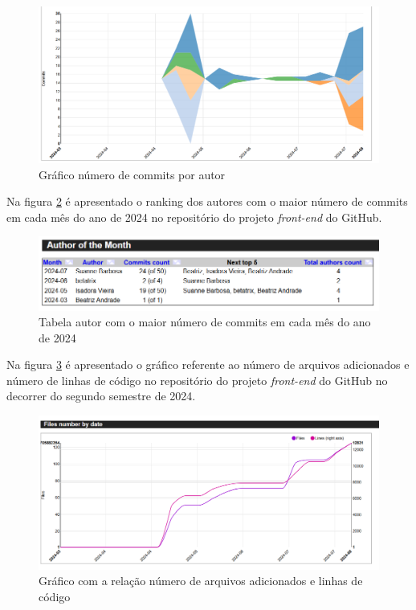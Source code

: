 \begin{figure}[ht]
        \centering
\includegraphics[width=1.0\textwidth]{images/commits-autor2-stats-front.png}
        \caption{Gráfico número de commits por autor}
        \label{fig:graficoCommitsPorAutorFront2}
    \end{figure}


Na figura \ref{fig:rankingAutoresFront} é apresentado o ranking dos autores com o maior número de commits em cada mês do ano de 2024 no repositório do projeto \textit{front-end} do GitHub.  

\begin{figure}[ht]
        \centering
\includegraphics[width=1.0\textwidth]{images/rank-autor-stats-front.png}
        \caption{Tabela autor com o maior número de commits em cada mês do ano de 2024}
        \label{fig:rankingAutoresFront}
    \end{figure}

\newpage

Na figura \ref{fig:numeroLinhasFront} é apresentado o gráfico referente ao número de arquivos adicionados e número de linhas de código no repositório do projeto \textit{front-end} do GitHub no decorrer do segundo semestre de 2024.

\begin{figure}[ht]
        \centering
\includegraphics[width=1.0\textwidth]{images/arquivos-por-data-stats-front.png}
        \caption{Gráfico com a relação número de arquivos adicionados e linhas de código}
        \label{fig:numeroLinhasFront}
    \end{figure}

